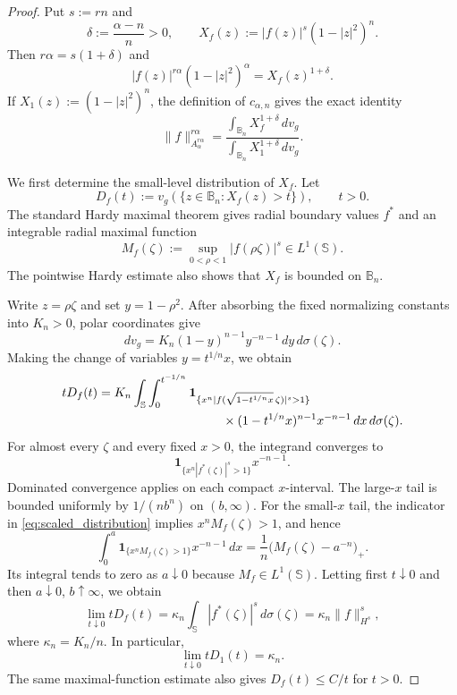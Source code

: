 \documentclass[11pt]{amsart}
\theoremstyle{plain}
\theoremstyle{definition}
\theoremstyle{remark}
\newcommand{\B}{\mathbb{B}}
\newcommand{\Sph}{\mathbb{S}}
\begin{document}
\begin{proof}
Put $s:=rn$ and
\[
\delta:=\frac{\alpha-n}{n}>0,
\qquad
X_f(z):=|f(z)|^s(1-|z|^2)^n.
\]
Then $r\alpha=s(1+\delta)$ and
\[
|f(z)|^{r\alpha}(1-|z|^2)^\alpha=X_f(z)^{1+\delta}.
\]
If $X_1(z):=(1-|z|^2)^n$, the definition of $c_{\alpha,n}$ gives the exact identity
\begin{equation}\label{eq:critical_ratio}
\|f\|_{A_\alpha^{r\alpha}}^{r\alpha}
=
\frac{\displaystyle\int_{\B_n}X_f^{1+\delta}\,dv_g}
{\displaystyle\int_{\B_n}X_1^{1+\delta}\,dv_g}.
\end{equation}

We first determine the small-level distribution of $X_f$.  Let
\[
D_f(t):=v_g(\{z\in\B_n:X_f(z)>t\}),\qquad t>0.
\]
The standard Hardy maximal theorem gives radial boundary values $f^*$ and an
integrable radial maximal function
\[
M_f(\zeta):=\sup_{0<\rho<1}|f(\rho\zeta)|^s\in L^1(\Sph).
\]
The pointwise Hardy estimate also shows that $X_f$ is bounded on $\B_n$.

Write $z=\rho\zeta$ and set $y=1-\rho^2$.  After absorbing the fixed
normalizing constants into $K_n>0$, polar coordinates give
\[
dv_g=K_n(1-y)^{n-1}y^{-n-1}\,dy\,d\sigma(\zeta).
\]
Making the change of variables $y=t^{1/n}x$, we obtain
\begin{align}
tD_f(t)
&=K_n\int_{\Sph}\int_0^{t^{-1/n}}
\mathbf 1_{\{x^n|f(\sqrt{1-t^{1/n}x}\,\zeta)|^s>1\}} \notag\\
&\hspace{35mm}\times(1-t^{1/n}x)^{n-1}x^{-n-1}\,dx\,d\sigma(\zeta).
\label{eq:scaled_distribution}
\end{align}
For almost every $\zeta$ and every fixed $x>0$, the integrand converges to
\[
\mathbf 1_{\{x^n|f^*(\zeta)|^s>1\}}x^{-n-1}.
\]
Dominated convergence applies on each compact $x$-interval.  The large-$x$
tail is bounded uniformly by $1/(nb^n)$ on $(b,\infty)$.  For the small-$x$
tail, the indicator in \eqref{eq:scaled_distribution} implies
$x^nM_f(\zeta)>1$, and hence
\[
\int_0^a\mathbf 1_{\{x^nM_f(\zeta)>1\}}x^{-n-1}\,dx
=\frac1n\bigl(M_f(\zeta)-a^{-n}\bigr)_+.
\]
Its integral tends to zero as $a\downarrow0$ because $M_f\in L^1(\Sph)$.
Letting first $t\downarrow0$ and then $a\downarrow0$, $b\uparrow\infty$, we obtain
\begin{equation}\label{eq:small_level_asymptotic}
\lim_{t\downarrow0}tD_f(t)
=\kappa_n\int_{\Sph}|f^*(\zeta)|^s\,d\sigma(\zeta)
=\kappa_n\|f\|_{H^s}^s,
\end{equation}
where $\kappa_n=K_n/n$.  In particular,
\begin{equation}\label{eq:model_small_level_asymptotic}
\lim_{t\downarrow0}tD_1(t)=\kappa_n.
\end{equation}
The same maximal-function estimate also gives $D_f(t)\le C/t$ for $t>0$.


\end{proof}
\end{document}
